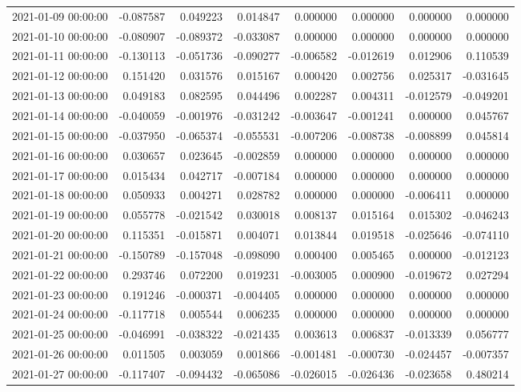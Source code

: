 \begin{tabular}{lrrrrrrr}
2021-01-09 00:00:00 & -0.087587 & 0.049223 & 0.014847 & 0.000000 & 0.000000 & 0.000000 & 0.000000 \\
2021-01-10 00:00:00 & -0.080907 & -0.089372 & -0.033087 & 0.000000 & 0.000000 & 0.000000 & 0.000000 \\
2021-01-11 00:00:00 & -0.130113 & -0.051736 & -0.090277 & -0.006582 & -0.012619 & 0.012906 & 0.110539 \\
2021-01-12 00:00:00 & 0.151420 & 0.031576 & 0.015167 & 0.000420 & 0.002756 & 0.025317 & -0.031645 \\
2021-01-13 00:00:00 & 0.049183 & 0.082595 & 0.044496 & 0.002287 & 0.004311 & -0.012579 & -0.049201 \\
2021-01-14 00:00:00 & -0.040059 & -0.001976 & -0.031242 & -0.003647 & -0.001241 & 0.000000 & 0.045767 \\
2021-01-15 00:00:00 & -0.037950 & -0.065374 & -0.055531 & -0.007206 & -0.008738 & -0.008899 & 0.045814 \\
2021-01-16 00:00:00 & 0.030657 & 0.023645 & -0.002859 & 0.000000 & 0.000000 & 0.000000 & 0.000000 \\
2021-01-17 00:00:00 & 0.015434 & 0.042717 & -0.007184 & 0.000000 & 0.000000 & 0.000000 & 0.000000 \\
2021-01-18 00:00:00 & 0.050933 & 0.004271 & 0.028782 & 0.000000 & 0.000000 & -0.006411 & 0.000000 \\
2021-01-19 00:00:00 & 0.055778 & -0.021542 & 0.030018 & 0.008137 & 0.015164 & 0.015302 & -0.046243 \\
2021-01-20 00:00:00 & 0.115351 & -0.015871 & 0.004071 & 0.013844 & 0.019518 & -0.025646 & -0.074110 \\
2021-01-21 00:00:00 & -0.150789 & -0.157048 & -0.098090 & 0.000400 & 0.005465 & 0.000000 & -0.012123 \\
2021-01-22 00:00:00 & 0.293746 & 0.072200 & 0.019231 & -0.003005 & 0.000900 & -0.019672 & 0.027294 \\
2021-01-23 00:00:00 & 0.191246 & -0.000371 & -0.004405 & 0.000000 & 0.000000 & 0.000000 & 0.000000 \\
2021-01-24 00:00:00 & -0.117718 & 0.005544 & 0.006235 & 0.000000 & 0.000000 & 0.000000 & 0.000000 \\
2021-01-25 00:00:00 & -0.046991 & -0.038322 & -0.021435 & 0.003613 & 0.006837 & -0.013339 & 0.056777 \\
2021-01-26 00:00:00 & 0.011505 & 0.003059 & 0.001866 & -0.001481 & -0.000730 & -0.024457 & -0.007357 \\
2021-01-27 00:00:00 & -0.117407 & -0.094432 & -0.065086 & -0.026015 & -0.026436 & -0.023658 & 0.480214 \\

\end{tabular}
